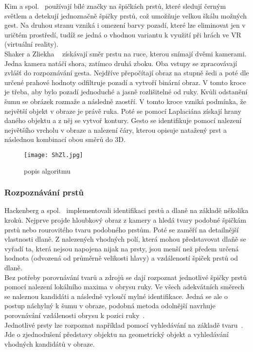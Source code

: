 Kim a spol.~\cite{5} používají bílé značky na špičkách prstů, které sledují černým světlem a detekují jednoznačně špičky prstů, což umožňuje velkou škálu možných gest. Na druhou stranu vzniká i omezení barvy pozadí, které lze eliminovat jen v uričtém prostředí, tudíž se jedná o vhodnou variantu k využití při hrách ve VR (virtuální reality).\\

Shaker a Zliekha ~\cite{12} získávají směr prstu na ruce, kterou snímají dvěmi kamerami. Jedna kamera natáčí shora, zatímco druhá zboku. Oba vstupy se zpracovávají zvlášť do rozpoznávání gesta. Nejdříve přepočítají obraz na stupně šedi a poté dle určené prahové hodnoty odfiltruje pozadí a vytvoří binární obraz. V tomto kroce je třeba, aby bylo pozadí jednoduché a jasně rozlišitelné od ruky. Kvůli odstanění šumu se obrázek rozmaže a následně zaostří. V tomto kroce vzniká podmínka, že největší objekt v obraze je právě ruka. Poté se pomocí Laplaciána získají hrany daného objektu a z něj se vytvoř kontury.
Gesto se identifikuje pomocí nalezení největšího vrcholu v obraze a nalezení čáry, kterou opisuje natažený prst a následnou kombinací obou směrů do 3D. 
\begin{figure}[h]
\centering
\texttt{[image: ShZl.jpg]}
\caption{popis algoritmu~\cite{12} } 
\end{figure}

\subsubsection{Rozpoznávání prstů}
Hackenberg a spol.~\cite{12} implementovali identifikaci prstů a dlaně na základě několika kroků. Nejprve projde hloubkový obraz z kamery a hledá tvary podobné špičkám prstů nebo rourovitého tvaru podobného prstům. Poté se zaměří na detailnější vlastnosti dlaně. Z nalezených vhodných polí, která mohou představovat dlaňě se vyřadí ta, která nejsou napojena nijak na prsty, jsou menší než předem určená hodnota (odvozená od průměrně velikosti hlavy) a vzdáleností špiček prstů od dlaně.\\


Bez potřeby porovnávání tvarů a zdrojů se dají rozpoznat jednotlivé špičky prstů pomocí nalezení lokálního maxima v obrysu ruky. Ve všech adekvátních směrech se naleznou kandidáti a následně vyloučí mylné identifikace. Jedná se ale o postup náchylný k šumu v obraze, podobná metoda odolnější navrhuje porovnávání vzdálenosti obrysu k pozici ruky~\cite{3}.\\
Jednotlivé prsty lze rozpoznat například pomocí vyhledávání na základě tvaru~\cite{4}. Jde o zjednodušení představy objektu na geometrický objekt a vyhledávání vhodných kandidátů v obraze. 

